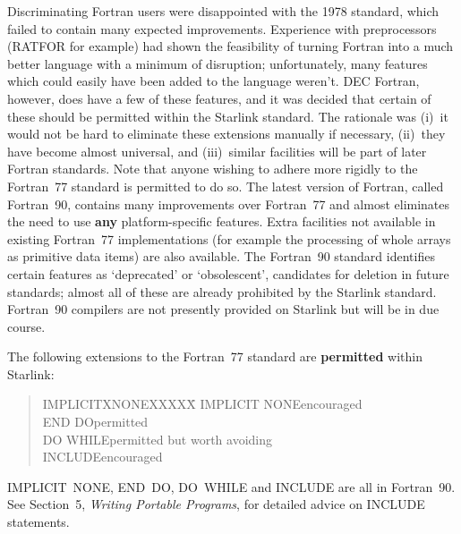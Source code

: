 \documentclass[twoside,11pt]{article}
\renewcommand{\_}{{\tt\char'137}}
\begin{document}
Discriminating Fortran users were disappointed with the 1978 standard, which
failed to contain many expected improvements.
Experience with preprocessors (RATFOR for example) had shown the feasibility of
turning Fortran into a much better language with a minimum of disruption;
unfortunately, many features which could easily have been added to the language
weren't.  DEC Fortran, however, does have a few of these features, and it
was decided that certain of these should be permitted within the Starlink
standard.  The rationale was
(i)~it would not be hard to eliminate these extensions manually if necessary,
(ii)~they have become almost universal, and
(iii)~similar facilities will be part of later Fortran standards.
Note that anyone wishing to adhere more rigidly to the Fortran~77 standard is
permitted to do so.
The latest version of Fortran, called Fortran~90, contains
many improvements over Fortran~77 and almost eliminates the need to
use {\bf any} platform-specific features.  Extra facilities not
available in existing Fortran~77 implementations (for example the
processing of whole arrays
as primitive data items) are also available.
The Fortran~90 standard identifies certain features as `deprecated'
or `obsolescent', candidates for deletion in future standards;
almost all of these are already prohibited by the Starlink standard.
Fortran~90 compilers are not presently provided on Starlink but
will be in due course.

The following extensions to the Fortran~77 standard are {\bf permitted}
within Starlink:
\begin{quote}
\begin{tabbing}
IMPLICITXNONEXXXXX\=\kill
IMPLICIT NONE\>encouraged\\
END DO\>permitted\\
DO WHILE\>permitted but worth avoiding\\
INCLUDE\>encouraged
\end{tabbing}
\end{quote}
IMPLICIT~NONE, END~DO, DO~WHILE and INCLUDE are all
in Fortran~90.  See Section~5, {\it Writing Portable
Programs}, for detailed advice on INCLUDE statements.
\end{document}
